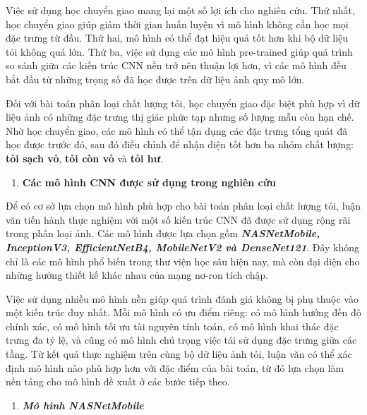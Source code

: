 \documentclass[
]{article}
\begin{document}
Việc sử dụng học chuyển giao mang lại một số lợi ích cho nghiên cứu. Thứ
nhất, học chuyển giao giúp giảm thời gian huấn luyện vì mô hình không
cần học mọi đặc trưng từ đầu. Thứ hai, mô hình có thể đạt hiệu quả tốt
hơn khi bộ dữ liệu tỏi không quá lớn. Thứ ba, việc sử dụng các mô hình
pre-trained giúp quá trình so sánh giữa các kiến trúc CNN nền trở nên
thuận lợi hơn, vì các mô hình đều bắt đầu từ những trọng số đã học được
trên dữ liệu ảnh quy mô lớn.

Đối với bài toán phân loại chất lượng tỏi, học chuyển giao đặc biệt phù
hợp vì dữ liệu ảnh có những đặc trưng thị giác phức tạp nhưng số lượng
mẫu còn hạn chế. Nhờ học chuyển giao, các mô hình có thể tận dụng các
đặc trưng tổng quát đã học được trước đó, sau đó điều chỉnh để nhận diện
tốt hơn ba nhóm chất lượng: \textbf{tỏi sạch vỏ}, \textbf{tỏi còn vỏ} và
\textbf{tỏi hư}.

\begin{enumerate}
\def\labelenumi{\arabic{enumi}.}
\setcounter{enumi}{5}
\item
  \protect{}\label{_Toc232112017}{}\textbf{Các mô hình CNN
  được sử dụng trong nghiên cứu}
\end{enumerate}

Để có cơ sở lựa chọn mô hình phù hợp cho bài toán phân loại chất lượng
tỏi, luận văn tiến hành thực nghiệm với một số kiến trúc CNN đã được sử
dụng rộng rãi trong phân loại ảnh. Các mô hình được lựa chọn gồm
\emph{\textbf{NASNetMobile, InceptionV3, EfficientNetB4, MobileNetV2 và
DenseNet121}}. Đây không chỉ là các mô hình phổ biến trong thư viện học
sâu hiện nay, mà còn đại diện cho những hướng thiết kế khác nhau của
mạng nơ-ron tích chập.

Việc sử dụng nhiều mô hình nền giúp quá trình đánh giá không bị phụ
thuộc vào một kiến trúc duy nhất. Mỗi mô hình có ưu điểm riêng: có mô
hình hướng đến độ chính xác, có mô hình tối ưu tài nguyên tính toán, có
mô hình khai thác đặc trưng đa tỷ lệ, và cũng có mô hình chú trọng việc
tái sử dụng đặc trưng giữa các tầng. Từ kết quả thực nghiệm trên cùng bộ
dữ liệu ảnh tỏi, luận văn có thể xác định mô hình nào phù hợp hơn với
đặc điểm của bài toán, từ đó lựa chọn làm nền tảng cho mô hình đề xuất ở
các bước tiếp theo.

\begin{enumerate}
\def\labelenumi{\arabic{enumi}.}
\item
  \protect{}\label{_Toc232112018}{}\emph{\textbf{Mô hình
  NASNetMobile}}
\end{enumerate}
\end{document}
